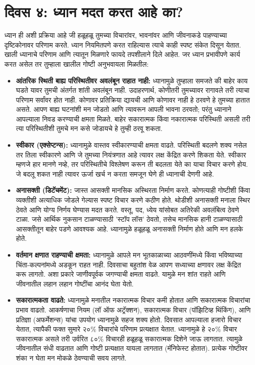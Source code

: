 \section*{दिवस ४: ध्यान मदत करत आहे का?}
ध्यान ही अशी प्रक्रिया आहे जी हळूहळू तुमच्या विचारांवर, भावनांवर आणि जीवनाकडे पाहण्याच्या दृष्टिकोनावर परिणाम करते. ध्यान नियमितपणे करत राहिल्यास त्याचे काही स्पष्ट संकेत दिसून येतात. खाली ध्यानाचे परिणाम आणि त्यातून मिळणारे फायदे तपशीलाने दिले आहेत.
जर ध्यान प्रभावीपणे कार्य करत असेल तर तुम्हाला खालील गोष्टी अनुभवायला मिळतील:
\begin{itemize}
\item
 \textbf{आंतरिक स्थिती बाह्य परिस्थितीवर अवलंबून राहात नाही:}
 ध्यानामुळे तुम्हाला समजते की बाहेर काय घडते यावर तुमची अंतर्गत शांती अवलंबून नाही. उदाहरणार्थ, कोणीतरी तुमच्यावर रागावले तरी त्याचा परिणाम सर्वांवर होत नाही. कोणावर प्रतिक्रिया द्यायची आणि कोणावर नाही हे ठरवणे हे तुमच्या हातात असते. आपण बाह्य घटनांशी मन जोडतो आणि त्यावरून आपली भावना ठरवतो; परंतु ध्यानाने आपल्याला निवड करण्याची क्षमता मिळते. बाहेर सकारात्मक किंवा नकारात्मक परिस्थिती असली तरी त्या परिस्थितीशी तुमचे मन कसे जोडायचे हे तुम्ही ठरवू शकता.
\item
 \textbf{स्वीकार (एक्सेप्टन्स):}
 ध्यानामुळे वास्तव स्वीकारण्याची क्षमता वाढते. परिस्थिती बदलणे शक्य नसेल तर तिला स्वीकारणे आणि जे तुमच्या नियंत्रणात आहे त्यावर लक्ष केंद्रित करणे शिकता येते. स्वीकार म्हणजे हार मानणे नव्हे, तर परिस्थितीचे विश्लेषण करून ती बदलता येते का याचा विचार करणे होय. जे बदलू शकत नाही त्यावर ऊर्जा खर्च न करता समजून घेणे ही ध्यानाची देणगी आहे.
\item
 \textbf{अनासक्ती (डिटॅचमेंट):}
 जास्त आसक्ती मानसिक अस्थिरता निर्माण करते. कोणत्याही गोष्टीशी किंवा व्यक्तीशी अत्याधिक जोडले गेल्यास स्पष्ट विचार करणे कठीण होते. थोडीशी अनासक्ती मनाला स्थिर ठेवते आणि योग्य निर्णय घेण्यास मदत करते. वस्तू, पद, ध्येय यांसोबत अतिरेकी अवलंबित्व ठेवणे टाळा. जसे आर्थिक नुकसान टाळण्यासाठी 'स्टॉप लॉस' ठेवतो, तसेच मानसिक हानी टाळण्यासाठी आसक्तीतून बाहेर पडणे आवश्यक आहे. ध्यानामुळे हळूहळू अनासक्ती निर्माण होते आणि मन हलके होते.
\item
 \textbf{वर्तमान क्षणात राहण्याची क्षमता:}
 ध्यानामुळे आपले मन भूतकाळाच्या आठवणींमध्ये किंवा भविष्याच्या चिंता-कल्पनांमध्ये अडकून राहत नाही. दिवसाचा बहुतांश वेळ आपण सध्याच्या क्षणावर लक्ष केंद्रित करू लागतो. अशा प्रकारे जाणीवपूर्वक जगण्याची क्षमता वाढते. यामुळे मन शांत राहते आणि जीवनातील लहान लहान गोष्टींचा आनंद घेता येतो.
\item
 \textbf{सकारात्मकता वाढते:}
 ध्यानामुळे मनातील नकारात्मक विचार कमी होतात आणि सकारात्मक विचारांचा प्रभाव वाढतो. आकर्षणाचा नियम (लॉ ऑफ अट्रॅक्शन), सकारात्मक विचार (पॉझिटिव्ह थिंकिंग), आणि प्रतिज्ञा (अफर्मेशन्स) यांचा उपयोग ध्यानामुळे सहज शक्य होतो. दिवसात आपल्याला हजारो विचार येतात, त्यापैकी फक्त सुमारे २०\% विचारांचे परिणाम प्रत्यक्षात येतात. ध्यानामुळे हे २०\% विचार सकारात्मक असले तरी उर्वरित ८०\% विचारही हळूहळू सकारात्मक दिशेने जाऊ लागतात. त्यामुळे जीवनातील संधी वाढतात आणि गोष्टी प्रत्यक्षात यायला लागतात (मॅनिफेस्ट होतात). प्रत्येक गोष्टीवर शंका न घेता मन मोकळे ठेवण्याची सवय लागते.

\end{itemize}
